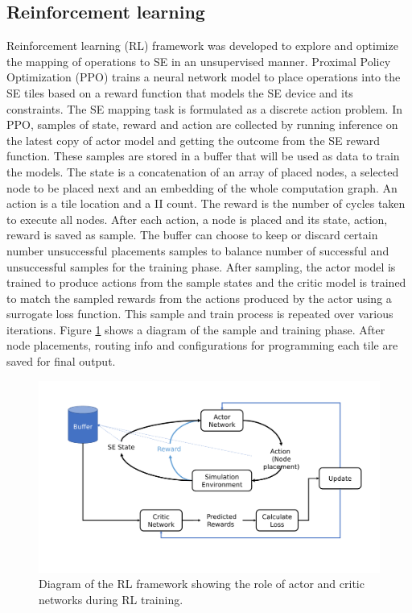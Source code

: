 \subsection{Reinforcement learning}

Reinforcement learning (RL) framework was developed to explore and optimize the mapping of operations to SE in an unsupervised 
manner. 
Proximal Policy Optimization (PPO) trains a neural network model to place operations into the SE tiles based on a reward 
function that models the SE device and its constraints. 
The SE mapping task is formulated as a discrete action problem. 
In PPO, samples of state, reward and action are collected by running inference on the latest copy of actor model and getting the outcome from the SE reward function. 
These samples are stored in a buffer that will be used as data to train the models. 
The state is a concatenation of an array of placed nodes, a selected node to be placed next and an embedding of the whole computation graph. 
An action is a tile location and a II count. 
The reward is the number of cycles taken to execute all nodes. 
After each action, a node is placed and its state, action, reward is saved as sample. 
The buffer can choose to keep or discard certain number unsuccessful placements samples to balance number of successful and unsuccessful samples for the training phase. 
After sampling, the actor model is trained to produce actions from the sample states and the critic model is trained to match the sampled rewards from the actions produced by the actor using a surrogate loss function. 
This sample and train process is repeated over various iterations. 
Figure \ref{fig:ppo} shows a diagram of the sample and training phase. 
After node placements, routing info and configurations for programming each tile are saved for final output.

\begin{figure}[h]
  \centering
  \includegraphics[width=\linewidth]{fig/ppo.pdf}
  \caption{Diagram of the RL framework showing the role of actor and critic networks during RL training. }
  \label{fig:ppo}
\end{figure}
